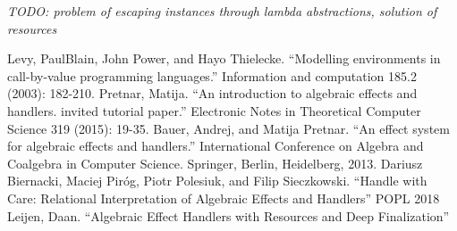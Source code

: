 \documentclass[12pt]{article}
\begin{document}
\textit{TODO: problem of escaping instances through lambda abstractions, solution of resources}

\begin{thebibliography}{9}
Levy, PaulBlain, John Power, and Hayo Thielecke. ``Modelling environments in call-by-value programming languages.'' Information and computation 185.2 (2003): 182-210.
Pretnar, Matija. ``An introduction to algebraic effects and handlers. invited tutorial paper.'' Electronic Notes in Theoretical Computer Science 319 (2015): 19-35.
Bauer, Andrej, and Matija Pretnar. ``An effect system for algebraic effects and handlers.'' International Conference on Algebra and Coalgebra in Computer Science. Springer, Berlin, Heidelberg, 2013.
Dariusz Biernacki, Maciej Piróg, Piotr Polesiuk, and Filip Sieczkowski. ``Handle with Care: Relational Interpretation of Algebraic Effects and Handlers'' POPL 2018
Leijen, Daan. ``Algebraic Effect Handlers with Resources and Deep Finalization''
\end{thebibliography}
\end{document}
